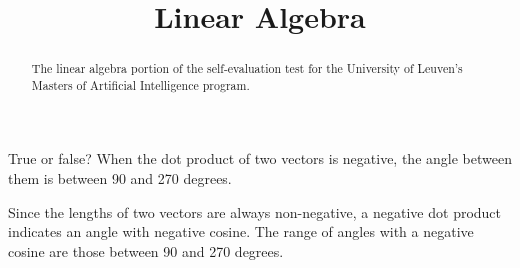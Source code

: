 \documentclass{ximera}
\title{Linear Algebra}
\begin{document}
\begin{abstract}
The linear algebra portion of the self-evaluation test for the
University of Leuven's Masters of Artificial Intelligence program.
\end{abstract}
\maketitle

\begin{question}
True or false?  When the dot product of two vectors is negative, the angle between them is between 90 and 270 degrees.
\begin{solution}
\begin{multiple-choice}
\end{multiple-choice}
\end{solution}
Since the lengths of two vectors are always non-negative, a negative dot product indicates an angle with negative cosine. The range of angles with a negative cosine are those between 90 and 270 degrees.
\end{question}
\end{document}
